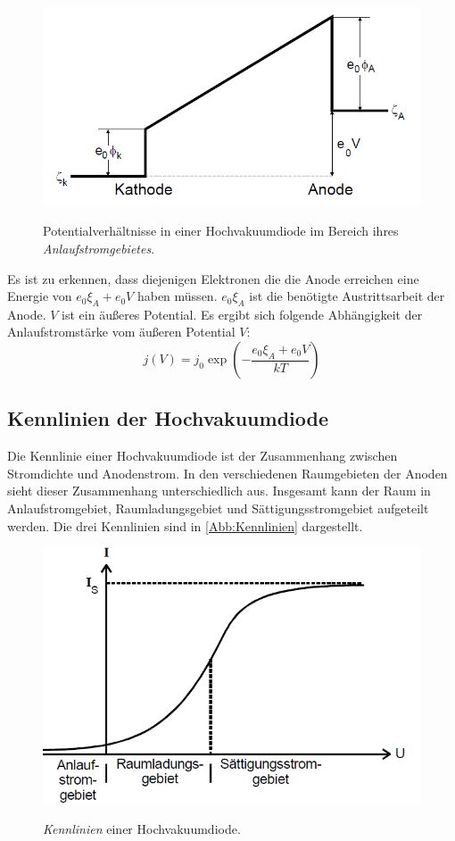 \begin{figure}[H]
    \centering
    \caption{Potentialverhältnisse in einer Hochvakuumdiode im Bereich ihres \textit{Anlaufstromgebietes}.\cite{sample}}
    \includegraphics[width=\textwidth]{Bilder/Anlauf.png}
    \label{Abb:Anlauf}
\end{figure}

Es ist zu erkennen, dass diejenigen Elektronen die die Anode erreichen eine Energie 
von $e_0 \xi_A + e_0 V$ haben müssen. $e_0 \xi_A$ ist die benötigte Austrittsarbeit der
Anode. $V$ ist ein äußeres Potential. Es ergibt sich folgende Abhängigkeit der Anlaufstromstärke
vom äußeren Potential $V$:
\begin{equation}
    \label{eqn:AnlaufStrom}
    j (V) = j_0 \exp{\left(-\frac{e_0 \xi_A + e_0 V}{kT}\right)}
\end{equation}

\subsection{Kennlinien der Hochvakuumdiode}

Die Kennlinie einer Hochvakuumdiode ist der Zusammenhang zwischen Stromdichte und
Anodenstrom. In den verschiedenen Raumgebieten der Anoden sieht dieser Zusammenhang 
unterschiedlich aus. Insgesamt kann der Raum in Anlaufstromgebiet, Raumladungsgebiet
und Sättigungsstromgebiet aufgeteilt werden. Die drei Kennlinien sind in 
\autoref{Abb:Kennlinien} dargestellt.
\begin{figure}[H]
    \centering
    \caption{\textit{Kennlinien} einer Hochvakuumdiode.\cite{sample}}
    \includegraphics[width=\textwidth]{Bilder/Kennlinien.png}
    \label{Abb:Kennlinien}
\end{figure}